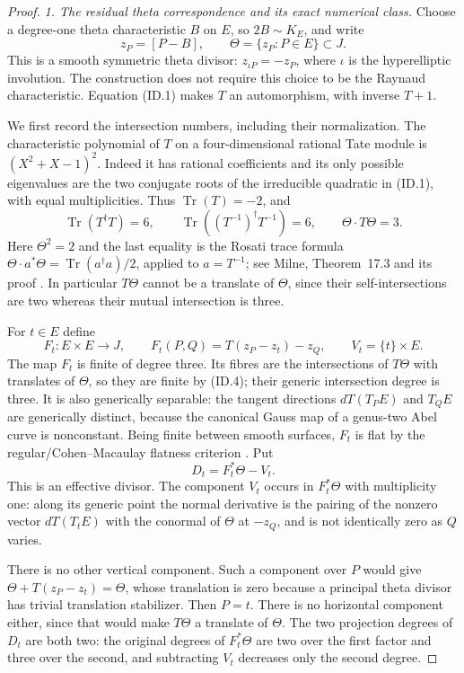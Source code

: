 \begin{proof}
\emph{1. The residual theta correspondence and its exact numerical class.}
Choose a degree-one theta characteristic $B$ on $E$, so $2B\sim K_E$,
and write
\[
             z_P=[P-B],\qquad \Theta=\{z_P:P\in E\}\subset J.
 \tag{ID.3}
\]
This is a smooth symmetric theta divisor: $z_{\iota P}=-z_P$,
where $\iota$ is the hyperelliptic involution. The construction
does not require this choice to be the Raynaud characteristic.
Equation (ID.1) makes $T$ an automorphism, with inverse $T+1$.

We first record the intersection numbers, including their
normalization. The characteristic polynomial of $T$ on a
four-dimensional rational Tate module is $(X^2+X-1)^2$.
Indeed it has rational coefficients and its only possible
eigenvalues are the two conjugate roots of the irreducible
quadratic in (ID.1), with equal multiplicities. Thus
$\operatorname{Tr}(T)=-2$, and
\[
 \operatorname{Tr}(T^\dagger T)=6,
 \qquad
 \operatorname{Tr}((T^{-1})^\dagger T^{-1})=6,
 \qquad \Theta\cdot T\Theta=3.
 \tag{ID.4}
\]
Here $\Theta^2=2$ and the last equality is the Rosati trace
formula $\Theta\cdot a^*\Theta=\operatorname{Tr}(a^\dagger a)/2$,
applied to $a=T^{-1}$; see Milne, Theorem~17.3 and its proof
\cite[pp.~35--36]{MilneAV}. In particular $T\Theta$ cannot
be a translate of $\Theta$, since their self-intersections
are two whereas their mutual intersection is three.

For $t\in E$ define
\[
 F_t:E\times E\longrightarrow J,
       \qquad F_t(P,Q)=T(z_P-z_t)-z_Q,
 \qquad V_t=\{t\}\times E.
 \tag{ID.5}
\]
The map $F_t$ is finite of degree three. Its fibres are the
intersections of $T\Theta$ with translates of $\Theta$, so
they are finite by (ID.4); their generic intersection degree
is three. It is also generically separable: the tangent
directions $dT(T_P E)$ and $T_Q E$ are generically distinct,
because the canonical Gauss map of a genus-two Abel curve
is nonconstant. Being finite between smooth surfaces, $F_t$
is flat by the regular/Cohen--Macaulay flatness criterion
\cite[Lemma~10.128.1, Tag~\texttt{00R4}]{Stacks00R4}.
Put
\[
                  D_t=F_t^*\Theta-V_t.
 \tag{ID.6}
\]
This is an effective divisor. The component $V_t$ occurs in
$F_t^*\Theta$ with multiplicity one: along its generic point
the normal derivative is the pairing of the nonzero vector
$dT(T_tE)$ with the conormal of $\Theta$ at $-z_Q$, and is
not identically zero as $Q$ varies.

There is no other vertical component. Such a component over
$P$ would give $\Theta+T(z_P-z_t)=\Theta$, whose translation
is zero because a principal theta divisor has trivial
translation stabilizer. Then $P=t$. There is no horizontal
component either, since that would make $T\Theta$ a translate
of $\Theta$. The two projection degrees of $D_t$ are both two:
the original degrees of $F_t^*\Theta$ are two over the first
factor and three over the second, and subtracting $V_t$
decreases only the second degree.


\end{proof}
